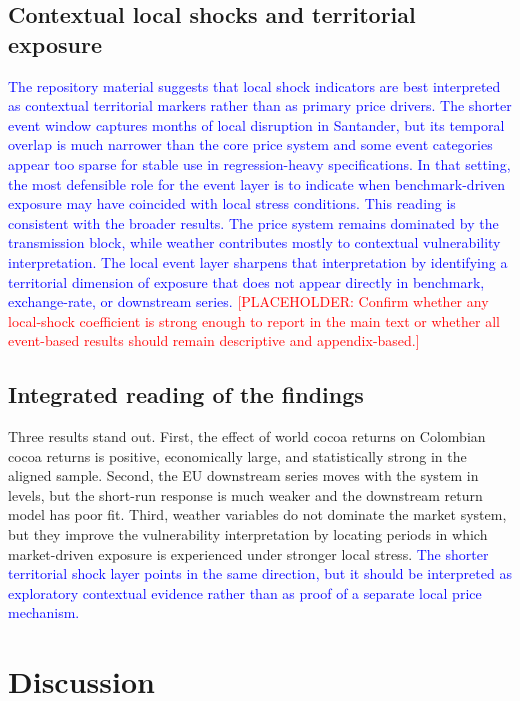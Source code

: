 \documentclass[11pt]{article}
\newcommand{\vTwo}[1]{\textcolor{blue}{#1}}
\newcommand{\placeholder}[1]{\textcolor{red}{[PLACEHOLDER: #1]}}
\begin{document}
\subsection{Contextual local shocks and territorial exposure}

\vTwo{The repository material suggests that local shock indicators are best interpreted as contextual territorial markers rather than as primary price drivers. The shorter event window captures months of local disruption in Santander, but its temporal overlap is much narrower than the core price system and some event categories appear too sparse for stable use in regression-heavy specifications. In that setting, the most defensible role for the event layer is to indicate when benchmark-driven exposure may have coincided with local stress conditions.} \vTwo{This reading is consistent with the broader results. The price system remains dominated by the transmission block, while weather contributes mostly to contextual vulnerability interpretation. The local event layer sharpens that interpretation by identifying a territorial dimension of exposure that does not appear directly in benchmark, exchange-rate, or downstream series.} \placeholder{Confirm whether any local-shock coefficient is strong enough to report in the main text or whether all event-based results should remain descriptive and appendix-based.}

\subsection{Integrated reading of the findings}

Three results stand out. First, the effect of world cocoa returns on Colombian cocoa returns is positive, economically large, and statistically strong in the aligned sample. Second, the EU downstream series moves with the system in levels, but the short-run response is much weaker and the downstream return model has poor fit. Third, weather variables do not dominate the market system, but they improve the vulnerability interpretation by locating periods in which market-driven exposure is experienced under stronger local stress. \vTwo{The shorter territorial shock layer points in the same direction, but it should be interpreted as exploratory contextual evidence rather than as proof of a separate local price mechanism.}

\section{Discussion}
\label{sec:discussion}
\end{document}
